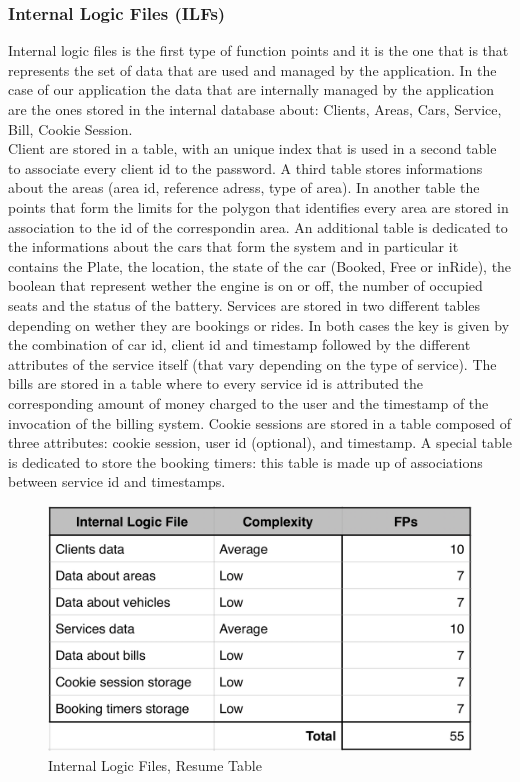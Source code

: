 \documentclass[a4paper,10pt]{article}
\begin{document}
\subsubsection{Internal Logic Files (ILFs)} Internal logic files is the first type of function points and it is the one that is that represents the 
set of data that are used and managed by the application. In the case of our application the data that are internally managed by the application 
are the ones stored in the internal database about: Clients, Areas, Cars, Service, Bill, Cookie Session.
\\Client are stored in a table, with an unique index that is used in a second table to associate every client id to the password.
A third table stores informations about the areas (area id, reference adress, type of area). In another table
the points that form the limits for the polygon that identifies every area are stored in association to the id of the correspondin area.
An additional table is dedicated to the informations about the cars that form the system and in particular it contains the Plate, the location,
the state of the car (Booked, Free or inRide), the boolean that represent wether the engine is on or off, the number of occupied seats and the 
status of the battery. Services are stored in two different tables depending on wether they are bookings or rides.
In both cases the key is given by the combination of car id, client id and timestamp 
followed by the different attributes of the service itself (that vary depending on the type of service).
The bills are stored in a table where to every service id is attributed the corresponding amount of money charged to the user and the timestamp 
of the invocation of the billing system. Cookie sessions are stored in a table composed of three attributes: cookie session, 
user id (optional), and timestamp.
A special table is dedicated to store the booking timers: this table is made up of associations between service id and timestamps.
  \begin{figure}[h]
  \centering
    \includegraphics[scale=0.2]{Resources/intlogic.png}
    \caption{Internal Logic Files, Resume Table}
  \end{figure}
\end{document}
